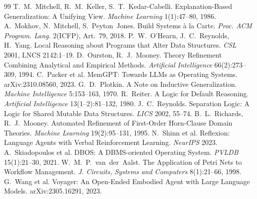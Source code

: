 \documentclass[11pt]{article}
\begin{document}
\begin{thebibliography}{99}
 T.~M.~Mitchell, R.~M.~Keller, S.~T.~Kedar-Cabelli. Explanation-Based Generalization: A Unifying View. \emph{Machine Learning} 1(1):47--80, 1986.
 A.~Mokhov, N.~Mitchell, S.~Peyton~Jones. Build Systems \`a la Carte. \emph{Proc. ACM Program. Lang.} 2(ICFP), Art.~79, 2018.
 P.~W.~O'Hearn, J.~C.~Reynolds, H.~Yang. Local Reasoning about Programs that Alter Data Structures. \emph{CSL} 2001, LNCS 2142:1--19.
 D.~Ourston, R.~J.~Mooney. Theory Refinement Combining Analytical and Empirical Methods. \emph{Artificial Intelligence} 66(2):273--309, 1994.
 C.~Packer et al. MemGPT: Towards LLMs as Operating Systems. arXiv:2310.08560, 2023.
 G.~D.~Plotkin. A Note on Inductive Generalization. \emph{Machine Intelligence} 5:153--163, 1970.
 R.~Reiter. A Logic for Default Reasoning. \emph{Artificial Intelligence} 13(1--2):81--132, 1980.
 J.~C.~Reynolds. Separation Logic: A Logic for Shared Mutable Data Structures. \emph{LICS} 2002, 55--74.
 B.~L.~Richards, R.~J.~Mooney. Automated Refinement of First-Order Horn-Clause Domain Theories. \emph{Machine Learning} 19(2):95--131, 1995.
 N.~Shinn et al. Reflexion: Language Agents with Verbal Reinforcement Learning. \emph{NeurIPS} 2023.
 A.~Skiadopoulos et al. DBOS: A DBMS-oriented Operating System. \emph{PVLDB} 15(1):21--30, 2021.
 W.~M.~P.~van~der~Aalst. The Application of Petri Nets to Workflow Management. \emph{J. Circuits, Systems and Computers} 8(1):21--66, 1998.
 G.~Wang et al. Voyager: An Open-Ended Embodied Agent with Large Language Models. arXiv:2305.16291, 2023.
\end{thebibliography}
\end{document}
